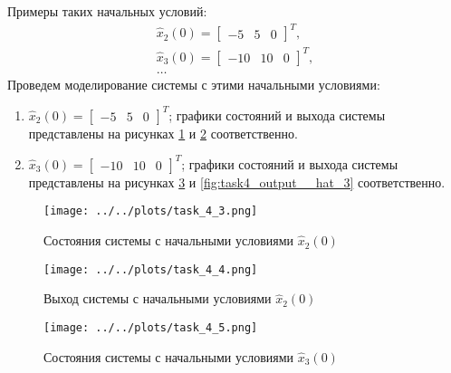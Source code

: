 Примеры таких начальных условий:
\begin{equation}
    \begin{array}{cc}
        \hat{x}_2(0) = \begin{bmatrix}
            -5 & 5 & 0
        \end{bmatrix}^T, \\
        \hat{x}_3(0) = \begin{bmatrix}
            -10 & 10 & 0
        \end{bmatrix}^T, \\
        \ldots
    \end{array}
\end{equation}
Проведем моделирование системы с этими начальными условиями: 
\begin{enumerate}
    \item $\hat{x}_2(0) = \begin{bmatrix}
        -5 & 5 & 0
    \end{bmatrix}^T$; графики состояний и выхода системы представлены на рисунках \ref{fig:task4_states_hat_2} и \ref{fig:task4_output_hat_2} соответственно.
    \item $\hat{x}_3(0) = \begin{bmatrix}
        -10 & 10 & 0 
    \end{bmatrix}^T$; графики состояний и выхода системы представлены на рисунках \ref{fig:task4_states_hat_3} и \ref{fig:task4_output__hat_3} соответственно.
\end{enumerate}

\begin{figure}[ht!]
    \centering
    \texttt{[image: ../../plots/task\_4\_3.png]}
    \caption{Состояния системы с начальными условиями $\hat{x}_2(0)$}
    \label{fig:task4_states_hat_2}
\end{figure}

\begin{figure}[ht!]
    \centering
    \texttt{[image: ../../plots/task\_4\_4.png]}
    \caption{Выход системы с начальными условиями $\hat{x}_2(0)$}
    \label{fig:task4_output_hat_2}
\end{figure}

\begin{figure}[ht!]
    \centering
    \texttt{[image: ../../plots/task\_4\_5.png]}
    \caption{Состояния системы с начальными условиями $\hat{x}_3(0)$}
    \label{fig:task4_states_hat_3}
\end{figure}


